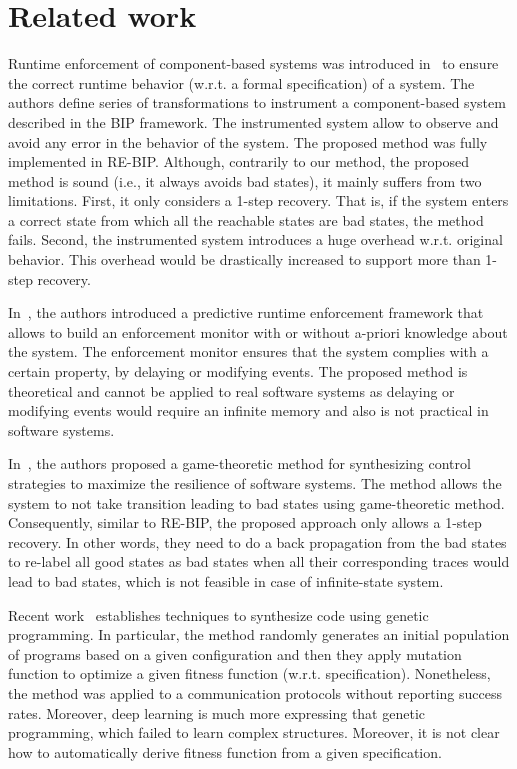 \section{Related work}
\label{sec:rw}
Runtime enforcement of component-based systems was introduced in~\cite{CharafeddineEFJ15} to ensure the correct runtime behavior (w.r.t. a formal specification) of a system. 
The authors define series of transformations to instrument a component-based system described in the BIP framework. The instrumented system allow to observe and avoid any error in the behavior of the system. 
The proposed method was fully implemented in RE-BIP. 
Although, contrarily to our method, the proposed method is sound (i.e., it always avoids bad states), it mainly suffers from two limitations. First, it only considers a 1-step recovery. That is, if the system enters a correct state from which all the reachable states are bad states, the method fails.  Second, the instrumented system introduces a huge overhead w.r.t. original behavior. This overhead would be drastically increased to support more than 1-step recovery. 

In~\cite{PinisettyPTJFM16,PinisettyT16}, the authors introduced a predictive runtime enforcement framework that allows to build an enforcement monitor with or without a-priori knowledge about the system. 
The enforcement monitor ensures that the system complies with a certain property, by delaying or modifying events. The proposed method is theoretical and cannot be applied to real software systems as delaying or modifying events would require an infinite memory and also is not practical in software systems. 

In~\cite{HuangPSW16}, the authors proposed a game-theoretic method for synthesizing control strategies to maximize the resilience of software systems. The method allows the system to not take transition leading to bad states using game-theoretic method. Consequently,  similar to RE-BIP, the proposed approach only allows a 1-step recovery. In other words, they need to do a back propagation from the bad states to re-label all good states as bad states when all their corresponding traces would lead to bad states, which is not feasible in case of infinite-state system. 


Recent work~\cite{genetic1,genetic2,genetic3} establishes techniques to synthesize code using genetic programming.  In particular, the method randomly generates an initial population of programs based on a given configuration and then they apply mutation function to optimize a given fitness function (w.r.t. specification). Nonetheless, the method was applied to a communication protocols without reporting success rates. Moreover, deep learning is much more expressing that genetic programming, which failed to learn complex structures. Moreover, it is not clear how to automatically derive fitness function from a given specification. 

